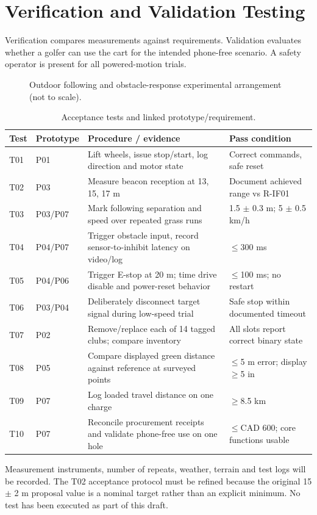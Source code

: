 \section{Verification and Validation Testing}
Verification compares measurements against requirements. Validation evaluates whether a golfer can use the cart for the intended phone-free scenario. A safety operator is present for all powered-motion trials.
\begin{figure}[ht]\centering{}\caption{Outdoor following and obstacle-response experimental arrangement (not to scale).}\end{figure}
\begin{table}[ht]\centering\scriptsize\caption{Acceptance tests and linked prototype/requirement.}\begin{tabularx}{\linewidth}{p{.10\linewidth}p{.21\linewidth}X p{.15\linewidth}}\toprule Test & Prototype & Procedure / evidence & Pass condition\\\midrule
T01 & P01 & Lift wheels, issue stop/start, log direction and motor state & Correct commands, safe reset\\
T02 & P03 & Measure beacon reception at 13, 15, 17 m & Document achieved range vs R-IF01\\
T03 & P03/P07 & Mark following separation and speed over repeated grass runs & 1.5 $\pm$ 0.3 m; 5 $\pm$ 0.5 km/h\\
T04 & P04/P07 & Trigger obstacle input, record sensor-to-inhibit latency on video/log & $\leq$300 ms\\
T05 & P04/P06 & Trigger E-stop at 20 m; time drive disable and power-reset behavior & $\leq$100 ms; no restart\\
T06 & P03/P04 & Deliberately disconnect target signal during low-speed trial & Safe stop within documented timeout\\
T07 & P02 & Remove/replace each of 14 tagged clubs; compare inventory & All slots report correct binary state\\
T08 & P05 & Compare displayed green distance against reference at surveyed points & $\leq$5 m error; display $\geq$5 in\\
T09 & P07 & Log loaded travel distance on one charge & $\geq$8.5 km\\
T10 & P07 & Reconcile procurement receipts and validate phone-free use on one hole & $\leq$CAD 600; core functions usable\\
\bottomrule\end{tabularx}\end{table}
Measurement instruments, number of repeats, weather, terrain and test logs will be recorded. The T02 acceptance protocol must be refined because the original 15 $\pm$ 2 m proposal value is a nominal target rather than an explicit minimum. No test has been executed as part of this draft.\par
